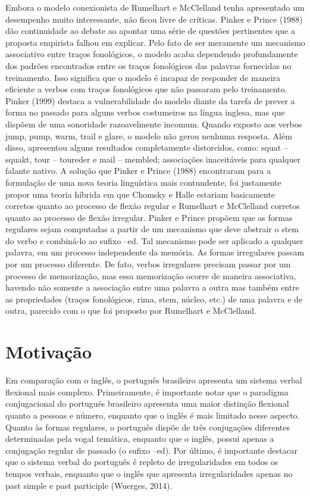 Embora o modelo conexionista de Rumelhart e McClelland tenha apresentado um desempenho muito interessante, não ficou livre de críticas. Pinker e Prince (1988) dão continuidade ao debate ao apontar uma série de questões pertinentes que a proposta empirista falhou em explicar.  Pelo fato de ser meramente um mecanismo associativo entre traços fonológicos, o modelo acaba dependendo profundamente dos padrões encontrados entre os traços fonológicos das palavras fornecidas no treinamento. Isso significa que o modelo é incapaz de responder de maneira eficiente a verbos com traços fonológicos que não passaram pelo treinamento. Pinker (1999) destaca a vulnerabilidade do modelo diante da tarefa de prever a forma no passado para alguns verbos costumeiros na língua inglesa, mas que dispõem de uma sonoridade razoavelmente incomum. Quando exposto aos verbos jump, pump, warm,  trail e glare, o modelo não gerou nenhuma resposta. Além disso, apresentou alguns resultados completamente distorcidos, como: squat – squakt, tour – toureder e mail – membled; associações inaceitáveis para qualquer falante nativo. A solução que Pinker e Prince (1988) encontraram para a formulação de uma nova teoria linguística mais contundente, foi justamente propor uma teoria híbrida em que Chomsky e Halle estariam basicamente corretos quanto ao processo de flexão regular e Rumelhart e McClelland corretos quanto ao processo de flexão irregular. Pinker e Prince propõem que as formas regulares sejam computadas a partir de um mecanismo que deve abstrair o stem do verbo e combiná-lo ao sufixo –ed.  Tal mecanismo pode ser aplicado a qualquer palavra, em um processo independente da memória. As formas irregulares passam por um processo diferente. De fato, verbos irregulares precisam passar por um processo de memorização, mas essa memorização ocorre de maneira associativa, havendo não somente a associação entre uma palavra a outra mas também entre as propriedades (traços fonológicos, rima, stem, núcleo, etc.) de uma palavra e de outra, parecido com o que foi proposto por Rumelhart e McClelland.
\section{Motivação}
\label{sec:motivation}

Em comparação com o inglês, o português brasileiro apresenta um sistema verbal flexional mais complexo. Primeiramente, é importante notar que o paradigma conjugacional do português brasileiro apresenta uma maior distinção flexional quanto a pessoas e número, enquanto que o inglês é mais limitado nesse aspecto. Quanto às formas regulares, o português dispõe de três conjugações diferentes determinadas pela vogal temática, enquanto que o inglês, possui apenas a conjugação regular de passado (o sufixo –ed). Por último, é importante destacar que o sistema verbal do português é repleto de irregularidades em todos os tempos verbais, enquanto que o inglês que apresenta irregularidades apenas no past simple e past participle (Wuerges, 2014).

